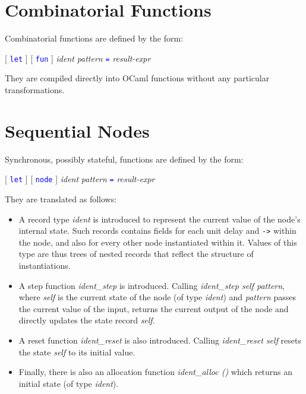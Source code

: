 \documentclass[11pt,titlepage,twoside]{report}
\makeatletter
\newcommand{\zls}[1]{{\@span{class="zelusinline"}#1}}
\newcommand{\zls}[1]{\texttt{#1}}
\renewcommand{\zls}[1]{\texttt{#1}}
\newenvironment{flatitemize}
  {\setenvclass{itemize}{flatitemize}%
   \begin{itemize}}
  {\end{itemize}}
\newenvironment{flatitemize}
  {\begin{itemize}[leftmargin=*]}
  {\end{itemize}}
\newcommand{\ocaml}{{\sf OCaml}}
\newcommand{\term}[1]{\textcolor{Blue}{\tt #1}}
\newcommand{\nterm}[1]{\textcolor{BrickRed}{\it #1}}
\newcommand{\term}[1]{{\tt #1}}
\newcommand{\nterm}[1]{{\em #1}}
\makeatother
\begin{document}
\section{Combinatorial Functions\label{combfuncs}} %

Combinatorial functions are defined by the form:
\begin{center}
  [ \term{let} ] [ \term{fun} ] \nterm{ident} \nterm{pattern} \term{=}
  \nterm{result-expr}
\end{center}

\medskip\noindent
They are compiled directly into \ocaml{} functions without any particular 
transformations.

\section{Sequential Nodes\label{seqnodes}} %

Synchronous, possibly stateful, functions are defined by the form:
\begin{center}
  [ \term{let} ] [ \term{node} ] \nterm{ident} \nterm{pattern} \term{=}
  \nterm{result-expr}
\end{center}

\medskip\noindent
They are translated as follows:
\begin{flatitemize}
\item
A record type \nterm{ident} is introduced to represent the current value of 
the node's internal state.
Such records contains fields for each unit delay and \zls{->} within the 
node, and also for every other node instantiated within it.
Values of this type are thus trees of nested records that reflect the 
structure of instantiations.

\item
A step function \nterm{ident\_step} is introduced.
Calling \nterm{ident\_step self pattern}, where \nterm{self} is the current 
state of the node (of type \nterm{ident}) and \nterm{pattern} passes the 
current value of the input, returns the current output of the node and 
directly updates the state record \nterm{self}.

\item
A reset function \nterm{ident\_reset} is also introduced.
Calling \nterm{ident\_reset self} resets the state \nterm{self} to its 
initial value.

\item
Finally, there is also an allocation function \nterm{ident\_alloc ()} which 
returns an initial state (of type \nterm{ident}).
\end{flatitemize}
\end{document}
